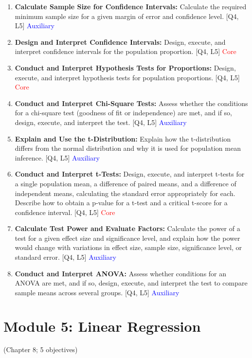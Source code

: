 \documentclass[12pt]{article}
\begin{document}
\begin{enumerate}
    \item \textbf{Calculate Sample Size for Confidence Intervals:} Calculate the required minimum sample size for a given margin of error and confidence level. [Q4, L5] \textcolor{blue}{Auxiliary}
    \item \textbf{Design and Interpret Confidence Intervals:} Design, execute, and interpret confidence intervals for the population proportion. [Q4, L5] \textcolor{red}{Core}
    \item \textbf{Conduct and Interpret Hypothesis Tests for Proportions:} Design, execute, and interpret hypothesis tests for population proportions. [Q4, L5] \textcolor{red}{Core}
    \item \textbf{Conduct and Interpret Chi-Square Tests:} Assess whether the conditions for a chi-square test (goodness of fit or independence) are met, and if so, design, execute, and interpret the test. [Q4, L5] \textcolor{blue}{Auxiliary}
    \item \textbf{Explain and Use the t-Distribution:} Explain how the t-distribution differs from the normal distribution and why it is used for population mean inference. [Q4, L5] \textcolor{blue}{Auxiliary}
    \item \textbf{Conduct and Interpret t-Tests:} Design, execute, and interpret t-tests for a single population mean, a difference of paired means, and a difference of independent means, calculating the standard error appropriately for each. Describe how to obtain a p-value for a t-test and a critical t-score for a confidence interval. [Q4, L5] \textcolor{red}{Core}
    \item \textbf{Calculate Test Power and Evaluate Factors:} Calculate the power of a test for a given effect size and significance level, and explain how the power would change with variations in effect size, sample size, significance level, or standard error. [Q4, L5] \textcolor{blue}{Auxiliary}
    \item \textbf{Conduct and Interpret ANOVA:} Assess whether conditions for an ANOVA are met, and if so, design, execute, and interpret the test to compare sample means across several groups. [Q4, L5] \textcolor{blue}{Auxiliary} 
\end{enumerate}

\newpage


\section{Module 5: Linear Regression}
(Chapter 8; 5 objectives)
\end{document}
